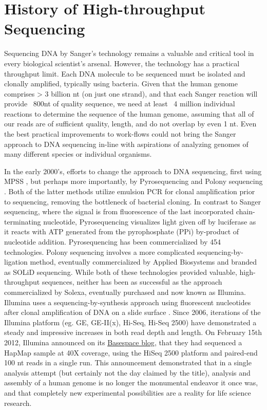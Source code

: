 \section{History of High-throughput Sequencing}

Sequencing DNA by Sanger’s technology remains a valuable and critical tool in every biological scientist’s arsenal. However, the technology has a practical throughput limit. Each DNA molecule to be sequenced must be isolated and clonally amplified, typically using bacteria. Given that the human genome \citep{Hattori2005a} comprises > 3 billion nt (on just one strand), and that each Sanger reaction will provide ~800nt of quality sequence, we need at least ~4 million individual reactions to determine the sequence of the human genome, assuming that all of our reads are of sufficient quality, length, and do not overlap by even 1 nt. Even the best practical improvements to work-flows could not bring the Sanger approach to DNA sequencing in-line with aspirations of analyzing genomes of many different species or individual organisms.

In the early 2000’s, efforts to change the approach to DNA sequencing, first using MPSS \citep{Brenner2000a}, but perhaps more importantly, by Pyrosequencing \citep{Ronaghi1998a} and Polony sequencing \citep{Shendure2005}. Both of the latter methods utilize emulsion PCR \citep{Nakano2003a} for clonal amplification prior to sequencing, removing the bottleneck of bacterial cloning. In contrast to Sanger sequencing, where the signal is from fluorescence of the last incorporated chain-terminating nucleotide, Pyrosequencing visualizes light given off by luciferase as it reacts with ATP generated from the pyrophosphate (PPi) by-product of nucleotide addition. Pyrosequencing has been commercialized by 454 technologies. Polony sequencing involves a more complicated sequencing-by-ligation method, eventually commercialized by Applied Biosystems and branded as SOLiD sequencing. While both of these technologies provided valuable, high-throughput sequences, neither has been as successful as the approach commercialized by Solexa, eventually purchased and now known as Illumina.
Illumina uses a sequencing-by-synthesis approach using fluorescent nucleotides after clonal amplification of DNA on a slide surface \citep{Bentley2008}. Since 2006, iterations of the Illumina platform (eg. GE, GE-II(x), Hi-Seq, Hi-Seq 2500) have demonstrated a steady and impressive increases in both read depth and length. On February 15th 2012, Illumina announced on its \href{http://blog.basespace.illumina.com/}{Basespace blog}, that they had sequenced a HapMap sample at 40X coverage, using the HiSeq 2500 platform and paired-end 100 nt reads in a single run. This announcement demonstrated that in a single analysis attempt (but certainly not the day claimed by the title), analysis and assembly of a human genome is no longer the monumental endeavor it once was, and that completely new experimental possibilities are a reality for life science research.

